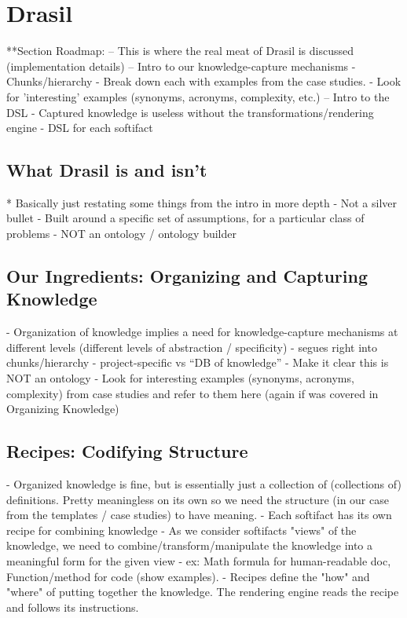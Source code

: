 \chapter{Drasil}

  **Section Roadmap:
    -- This is where the real meat of Drasil is discussed (implementation details)
    -- Intro to our knowledge-capture mechanisms
      - Chunks/hierarchy
      - Break down each with examples from the case studies.
      - Look for 'interesting' examples (synonyms, acronyms, complexity, etc.)
    -- Intro to the DSL
      - Captured knowledge is useless without the transformations/rendering engine
      - DSL for each softifact
      
\section{What Drasil is and isn't}
  * Basically just restating some things from the intro in more depth
  - Not a silver bullet
  - Built around a specific set of assumptions, for a particular class of problems
  - NOT an ontology / ontology builder

\section{Our Ingredients: Organizing and Capturing Knowledge}
  - Organization of knowledge implies a need for knowledge-capture mechanisms 
    at different levels (different levels of abstraction / specificity)
  - segues right into chunks/hierarchy
   - project-specific vs “DB of knowledge”
   - Make it clear this is NOT an ontology
   - Look for interesting examples (synonyms, acronyms, complexity) from case studies and refer to them here (again if was covered in Organizing Knowledge)

\section{Recipes: Codifying Structure}
  - Organized knowledge is fine, but is essentially just a collection of (collections of) definitions. Pretty meaningless on its own so we need the structure (in our case from the templates / case studies) to have meaning.
  - Each softifact has its own recipe for combining knowledge
  - As we consider softifacts "views" of the knowledge, we need to combine/transform/manipulate the knowledge into a meaningful form for the given view - ex: Math formula for human-readable doc, Function/method for code (show examples).
  - Recipes define the "how" and "where" of putting together the knowledge. The rendering engine reads the recipe and follows its instructions.

